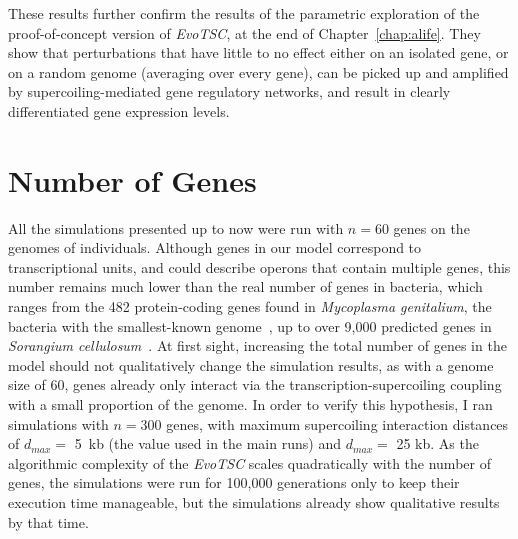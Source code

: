 These results further confirm the results of the parametric exploration of the proof-of-concept version of \emph{EvoTSC}, at the end of Chapter~\ref{chap:alife}.
They show that perturbations that have little to no effect either on an isolated gene, or on a random genome (averaging over every gene), can be picked up and amplified by supercoiling-mediated gene regulatory networks, and result in clearly differentiated gene expression levels.


\section{Number of Genes}
\label{sec:param:300-genes}

All the simulations presented up to now were run with $n = 60$ genes on the genomes of individuals.
Although genes in our model correspond to transcriptional units, and could describe operons that contain multiple genes, this number remains much lower than the real number of genes in bacteria, which ranges from the 482 protein-coding genes found in \emph{Mycoplasma genitalium}, the bacteria with the smallest-known genome~\citep{glass2006}, up to over 9,000 predicted genes in \emph{Sorangium cellulosum}~\citep{schneiker2007}.
At first sight, increasing the total number of genes in the model should not qualitatively change the simulation results, as with a genome size of 60, genes already only interact via the transcription-supercoiling coupling with a small proportion of the genome.
In order to verify this hypothesis, I ran simulations with $n = 300$ genes, with maximum supercoiling interaction distances of $d_{max} =$ 5~kb (the value used in the main runs) and $d_{max} =$ 25 kb.
As the algorithmic complexity of the \emph{EvoTSC} scales quadratically with the number of genes, the simulations were run for 100,000 generations only to keep their execution time manageable, but the simulations already show qualitative results by that time.

